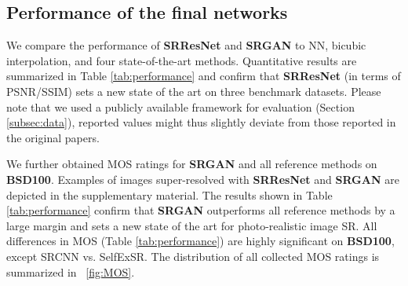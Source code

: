 \documentclass[10pt,twocolumn,letterpaper]{article}
\begin{document}
\subsection{Performance of the final networks}
\label{subsec:msebased}
We compare the performance of \textbf{SRResNet} and \textbf{SRGAN} to NN, bicubic interpolation, and four state-of-the-art methods.
Quantitative results are summarized in Table \ref{tab:performance} and confirm that \textbf{SRResNet} (in terms of PSNR/SSIM) sets a new state of the art on three benchmark datasets.
Please note that we used a publicly available framework for evaluation (\cf Section \ref{subsec:data}), reported values might thus slightly deviate from those reported in the original papers.

We further obtained \ac{MOS} ratings for \textbf{SRGAN} and all reference methods on \textbf{BSD100}. Examples of images super-resolved with \textbf{SRResNet} and \textbf{SRGAN} are depicted in the supplementary material.
The results shown in Table \ref{tab:performance} confirm that \textbf{SRGAN} outperforms all reference methods by a large margin and sets a new state of the art for photo-realistic image \ac{SR}. All differences in \ac{MOS} (\cf Table \ref{tab:performance}) are highly significant on \textbf{BSD100}, except SRCNN vs. SelfExSR. The distribution of all collected \ac{MOS} ratings is summarized in \figurename~\ref{fig:MOS}.
\end{document}
